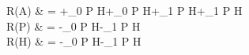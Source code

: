 R({A}) & = +\phi_0 P H+\phi_0 P H+\phi_1 P H+\phi_1 P H\\ 
R({P}) & = -\phi_0 P H-\phi_1 P H\\ 
R({H}) & = -\phi_0 P H-\phi_1 P H